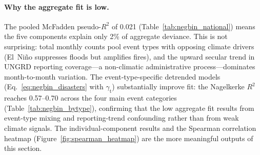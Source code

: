 \documentclass[12pt]{article}
\begin{document}
\paragraph{Why the aggregate fit is low.}
The pooled McFadden pseudo-$R^2$ of 0.021 (Table~\ref{tab:negbin_national}) means the five components explain only 2\% of aggregate deviance. This is not surprising: total monthly counts pool event types with opposing climate drivers (El~Ni\~no suppresses floods but amplifies fires), and the upward secular trend in UNGRD reporting coverage---a non-climatic administrative process---dominates month-to-month variation. The event-type-specific detrended models (Eq.~\eqref{eq:negbin_disasters} with $\gamma_{\mathrm{t}}$) substantially improve fit: the Nagelkerke $R^2$ reaches 0.57--0.70 across the four main event categories (Table~\ref{tab:negbin_bytype}), confirming that the low aggregate fit results from event-type mixing and reporting-trend confounding rather than from weak climate signals. The individual-component results and the Spearman correlation heatmap (Figure~\ref{fig:spearman_heatmap}) are the more meaningful outputs of this section.

\begin{table}[H]
\centering\small
\renewcommand{\arraystretch}{1.2}
\setlength{\tabcolsep}{5pt}
\caption{Negative binomial regression of national monthly climate-event counts on ACI-CO components (1998--2022, $n=300$ monthly observations). Covariates are national standardized anomalies ($\sigma$ units). Month fixed effects included. IRR $= e^{\hat\beta}$ is the incidence rate ratio. McFadden pseudo-$R^2 = 0.021$. Stars: ${}^*p<0.05$, ${}^{**}p<0.01$, ${}^{***}p<0.001$.}
\label{tab:negbin_national}
\end{table}
\end{document}
